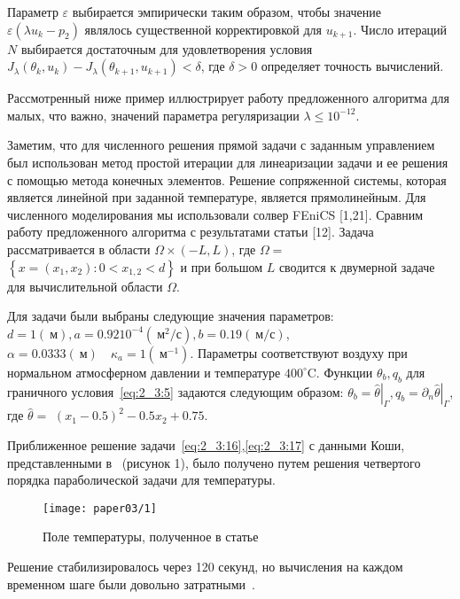 Параметр $\varepsilon$ выбирается эмпирически таким образом, чтобы
значение $\varepsilon\left(\lambda u_{k}-p_{2}\right)$ являлось
существенной корректировкой для $u_{k+1}$.
Число итераций $N$ выбирается достаточным для
удовлетворения условия $J_{\lambda}\left(\theta_{k}, u_{k}\right)
-J_{\lambda}\left(\theta_{k+1}, u_{k+1}\right)<\delta$, где $\delta>0$
определяет точность вычислений.

Рассмотренный ниже пример иллюстрирует работу предложенного
алгоритма для малых, что важно, значений параметра регуляризации
$\lambda \leq 10^{-12}$.


Заметим, что для численного решения прямой задачи с заданным управлением
был использован метод простой итерации для линеаризации задачи и ее решения
с помощью метода конечных элементов.
Решение сопряженной системы, которая является линейной
при заданной температуре, является прямолинейным.
Для численного моделирования мы использовали солвер FEniCS [1,21].
Сравним работу предложенного
алгоритма с результатами статьи [12].
Задача рассматривается в области $\Omega \times(-L, L)$,
где $\Omega=$ $\left\{x=\left(x_{1}, x_{2}\right): 0<x_{1,2}<d\right\}$
и при большом $L$ сводится к двумерной задаче для вычислительной
области $\Omega$.

Для задачи были выбраны следующие значения параметров:
$d=1(\mathrm{~м}), a=0.9210^{-4}\left(\mathrm{~м}^{2} / \mathrm{с}\right),
b=0.19(\mathrm{~м} / \mathrm{с})$, $\alpha=0.0333(\mathrm{~м})
\quad \kappa_{a}=1\left(\mathrm{~м}^{-1}\right)$.
Параметры соответствуют воздуху при нормальном атмосферном давлении
и температуре $400^{\circ} \mathrm{C}$.
Функции $\theta_{b}, q_{b}$ для граничного условия~\eqref{eq:2_3:5}
задаются следующим образом: $\theta_{b}=\left.\widehat{\theta}\right|_{\Gamma},
q_{b}=\left.\partial_{n} \widehat{\theta}\right|_{\Gamma}$,
где $\widehat{\theta}=$ $\left(x_{1}-0.5\right)^{2}-0.5 x_{2}+0.75$.

Приближенное решение задачи~\eqref{eq:2_3:16},\eqref{eq:2_3:17}
с данными Коши, представленными в~\cite{Chebotarev2019Problem}
(рисунок 1), было получено путем решения четвертого порядка
параболической задачи для температуры.

\begin{figure}[h]
    \label{fig:2_3:1}
    \texttt{[image: paper03/1]}
    \caption{Поле температуры, полученное в
    статье~\cite{Chebotarev2019Problem}}
\end{figure}

Решение стабилизировалось через 120 секунд, но
вычисления на каждом временном шаге были
довольно затратными~\cite{Chebotarev2019Problem}.

